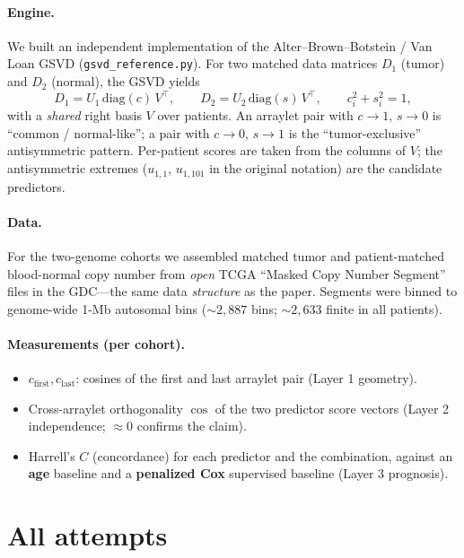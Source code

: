 \documentclass[11pt]{article}
\begin{document}
\paragraph{Engine.} We built an independent implementation of the
Alter--Brown--Botstein / Van Loan GSVD
(\texttt{gsvd\_reference.py}). For two matched data matrices $D_1$ (tumor) and
$D_2$ (normal), the GSVD yields
\[
D_1 = U_1 \,\mathrm{diag}(c)\, V^{\!\top}, \qquad
D_2 = U_2 \,\mathrm{diag}(s)\, V^{\!\top}, \qquad c_i^2 + s_i^2 = 1,
\]
with a \emph{shared} right basis $V$ over patients. An arraylet pair with
$c \to 1,\, s \to 0$ is ``common / normal-like''; a pair with $c \to 0,\, s \to
1$ is the ``tumor-exclusive'' antisymmetric pattern. Per-patient scores are taken
from the columns of $V$; the antisymmetric extremes ($u_{1,1}$, $u_{1,101}$ in
the original notation) are the candidate predictors.

\paragraph{Data.} For the two-genome cohorts we assembled matched tumor and
patient-matched blood-normal copy number from \emph{open} TCGA ``Masked Copy
Number Segment'' files in the GDC---the same data \emph{structure} as the paper.
Segments were binned to genome-wide 1-Mb autosomal bins ($\sim 2{,}887$ bins;
$\sim 2{,}633$ finite in all patients).

\paragraph{Measurements (per cohort).}
\begin{itemize}[leftmargin=*, nosep]
  \item $c_{\text{first}}, c_{\text{last}}$: cosines of the first and last
    arraylet pair (Layer 1 geometry).
  \item Cross-arraylet orthogonality $\cos$ of the two predictor score vectors
    (Layer 2 independence; $\approx 0$ confirms the claim).
  \item Harrell's $C$ (concordance) for each predictor and the combination,
    against an \textbf{age} baseline and a \textbf{penalized Cox} supervised
    baseline (Layer 3 prognosis).
\end{itemize}

\section{All attempts}
\end{document}
